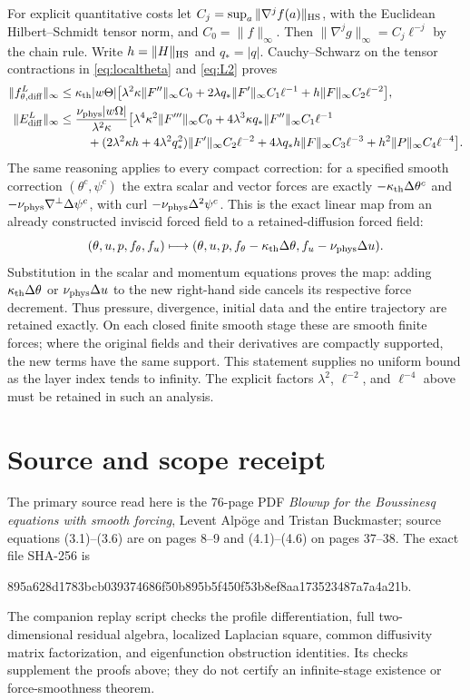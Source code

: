 \documentclass[11pt]{article}
\newcommand{\thd}{\kappa_{\rm th}}
\newcommand{\vis}{\nu_{\rm phys}}
\begin{document}
For explicit quantitative costs let
$C_j=\sup_a\|\nabla^jf(a)\|_{\rm HS}$, with the Euclidean
Hilbert--Schmidt tensor norm, and $C_0=\|f\|_\infty$.
Then $\|\nabla^jg\|_\infty=C_j\ell^{-j}$ by the chain rule. Write
$h=\|H\|_{\rm HS}$ and $q_*=|q|$. Cauchy--Schwarz on the tensor
contractions in \eqref{eq:localtheta} and \eqref{eq:L2} proves
\begin{align}
 \|f^L_{\theta,\mathrm{diff}}\|_\infty
 \leq{}&\thd|w\Theta|\big[
 \lambda^2\kappa\|F''\|_\infty C_0
 +2\lambda q_*\|F'\|_\infty C_1\ell^{-1}
 +h\|F\|_\infty C_2\ell^{-2}\big],\label{eq:costtheta}\\
 \|E^L_{\mathrm{diff}}\|_\infty
 \leq{}&\frac{\vis|w\Omega|}{\lambda^2\kappa}\big[
 \lambda^4\kappa^2\|F'''\|_\infty C_0
 +4\lambda^3\kappa q_*\|F''\|_\infty C_1\ell^{-1}\notag\\
 &\quad+(2\lambda^2\kappa h+4\lambda^2q_*^2)
       \|F'\|_\infty C_2\ell^{-2}
 +4\lambda q_*h\|F\|_\infty C_3\ell^{-3}
 +h^2\|P\|_\infty C_4\ell^{-4}\big].\label{eq:costomega}
\end{align}
The same reasoning applies to every compact correction: for a specified
smooth correction $(\theta^c,\psi^c)$ the extra scalar and vector forces
are exactly $-\thd\Delta\theta^c$ and
$-\vis\nabla^\perp\Delta\psi^c$, with curl
$-\vis\Delta^2\psi^c$. This is the exact linear map from an already
constructed inviscid forced field to a retained-diffusion forced field:
\begin{equation}\label{eq:force-map}
 (\theta,u,p,f_\theta,f_u)\longmapsto
 (\theta,u,p,f_\theta-\thd\Delta\theta,
                      f_u-\vis\Delta u).
\end{equation}
Substitution in the scalar and momentum equations proves the map:
adding $\thd\Delta\theta$ or $\vis\Delta u$ to the new right-hand side
cancels its respective force decrement. Thus pressure, divergence,
initial data and the entire trajectory are retained exactly. On each
closed finite smooth stage these are smooth finite forces; where the
original fields and their derivatives are compactly supported, the new
terms have the same support. This statement supplies no uniform bound
as the layer index tends to infinity. The explicit factors
$\lambda^2$, $\ell^{-2}$, and $\ell^{-4}$ above must be retained in such
an analysis.

\section*{Source and scope receipt}
The primary source read here is the 76-page PDF
\emph{Blowup for the Boussinesq equations with smooth forcing},
Levent Alp\"oge and Tristan Buckmaster; source equations (3.1)--(3.6)
are on pages 8--9 and (4.1)--(4.6) on pages 37--38.
The exact file SHA-256 is
\begin{center}\small\ttfamily
895a628d1783bcb039374686f50b895b5f450f53b8ef8aa173523487a7a4a21b.
\end{center}
The companion replay script checks the profile differentiation, full
two-dimensional residual algebra, localized Laplacian square, common
diffusivity matrix factorization, and eigenfunction obstruction
identities. Its checks supplement the proofs above; they do not certify
an infinite-stage existence or force-smoothness theorem.
\end{document}
